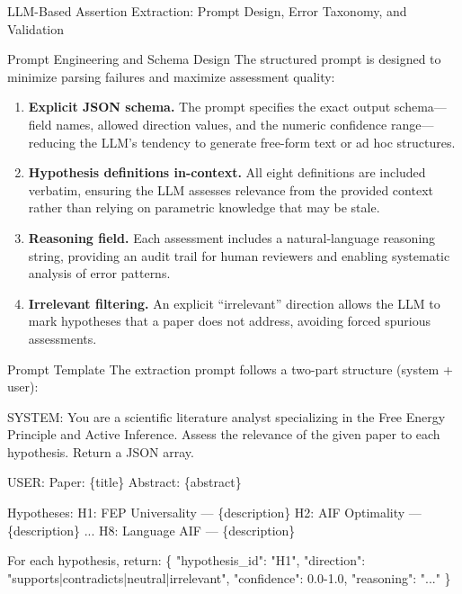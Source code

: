 \documentclass[
  ignorenonframetext,
]{beamer}
\newenvironment{Shaded}{}{}
\newcommand{\NormalTok}[1]{#1}
\begin{document}
\begin{frame}[fragile]{LLM-Based Assertion Extraction: Prompt Design,
Error Taxonomy, and Validation \label{sec:extraction_pipeline}}
\begin{block}{Prompt Engineering and Schema Design}
\protect{}\label{prompt-engineering-and-schema-design}
The structured prompt is designed to minimize parsing failures and
maximize assessment quality:

\begin{enumerate}
\item
  \textbf{Explicit JSON schema.} The prompt specifies the exact output
  schema---field names, allowed direction values, and the numeric
  confidence range---reducing the LLM's tendency to generate free-form
  text or ad hoc structures.
\item
  \textbf{Hypothesis definitions in-context.} All eight definitions are
  included verbatim, ensuring the LLM assesses relevance from the
  provided context rather than relying on parametric knowledge that may
  be stale.
\item
  \textbf{Reasoning field.} Each assessment includes a natural-language
  reasoning string, providing an audit trail for human reviewers and
  enabling systematic analysis of error patterns.
\item
  \textbf{Irrelevant filtering.} An explicit ``irrelevant'' direction
  allows the LLM to mark hypotheses that a paper does not address,
  avoiding forced spurious assessments.
\end{enumerate}

\begin{block}{Prompt Template}
\protect{}\label{prompt-template}
The extraction prompt follows a two-part structure (system + user):

\begin{Shaded}
\begin{Highlighting}[]
\NormalTok{SYSTEM: You are a scientific literature analyst specializing in the}
\NormalTok{Free Energy Principle and Active Inference. Assess the relevance of}
\NormalTok{the given paper to each hypothesis. Return a JSON array.}

\NormalTok{USER:}
\NormalTok{Paper: \{title\}}
\NormalTok{Abstract: \{abstract\}}

\NormalTok{Hypotheses:}
\NormalTok{H1: FEP Universality — \{description\}}
\NormalTok{H2: AIF Optimality — \{description\}}
\NormalTok{...}
\NormalTok{H8: Language AIF — \{description\}}

\NormalTok{For each hypothesis, return:}
\NormalTok{\{}
\NormalTok{  "hypothesis\_id": "H1",}
\NormalTok{  "direction": "supports|contradicts|neutral|irrelevant",}
\NormalTok{  "confidence": 0.0{-}1.0,}
\NormalTok{  "reasoning": "..."}
\NormalTok{\}}
\end{Highlighting}
\end{Shaded}


\end{block}
\end{block}
\end{frame}
\end{document}
